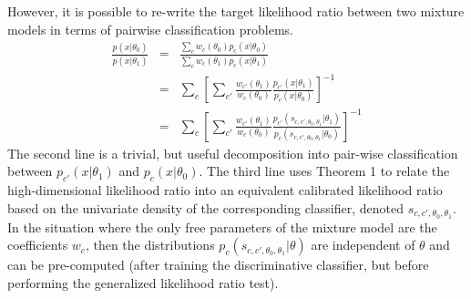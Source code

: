\documentclass[11pt, oneside]{article}   	%
\begin{document}
However, it is possible to re-write the target likelihood ratio between two mixture models in terms of pairwise classification problems. 
\begin{eqnarray}
\frac{p(x|\theta_0)}{p(x|\theta_1)} & =& \frac{\sum_c w_c(\theta_0) p_c(x| \theta_0)}{\sum_c w_c(\theta_1) p_c(x| \theta_1)} 
\\
&=& \sum_c \left[ \sum_{c'} \frac{ w_{c'}(\theta_1)}{w_c(\theta_0)} \frac{ p_{c'}(x| \theta_1)}{  p_c(x| \theta_0)}  \right]^{-1} \\
&=& \sum_c \left[ \sum_{c'} \frac{ w_{c'}(\theta_1)}{w_c(\theta_0)} \frac{ p_{c'}(s_{c,c',\theta_0, \theta_1}| \theta_1)}{ p_c(s_{c,c',\theta_0, \theta_1}| \theta_0)}  \right]^{-1} 
\end{eqnarray}
The second line is a trivial, but useful decomposition into pair-wise classification between $p_{c'}(x|\theta_1)$ and $p_c(x|\theta_0)$.  The third line uses Theorem 1 to relate the high-dimensional likelihood ratio into an equivalent calibrated likelihood ratio based on the univariate density of the corresponding classifier, denoted $s_{c,c',\theta_0, \theta_1}$. In the situation where the only free parameters of the mixture model are the coefficients $w_c$, then the distributions $p_{c}(s_{c,c',\theta_0, \theta_1}| \theta)$ are independent of $\theta$ and can be pre-computed (after training the discriminative classifier, but before performing the generalized likelihood ratio test).


%
\end{document}
